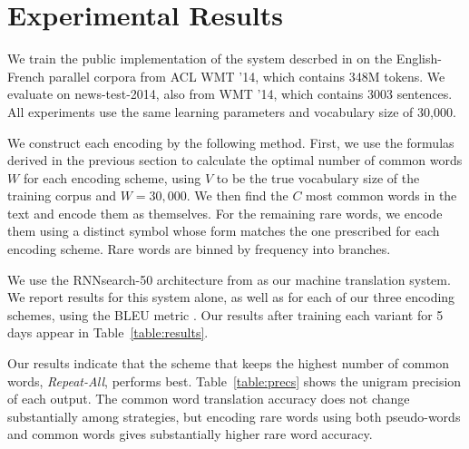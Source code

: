 \section{Experimental Results}
\label{sec:exp}

We train the public implementation of the system descrbed in
 on the English-French parallel corpora
from ACL WMT '14, which contains 348M tokens. We evaluate on news-test-2014,
also from WMT '14, which contains 3003 sentences. All experiments use the same
learning parameters and vocabulary size of 30,000.

We construct each encoding by the following method. First, we use the formulas
derived in the previous section to calculate the optimal number of common words
$W$ for each encoding scheme, using $V$ to be the true vocabulary size of the
training corpus and $W = 30,000$. We then find the $C$ most common words in the
text and encode them as themselves. For the remaining rare words, we encode
them using a distinct symbol whose form matches the one prescribed for each
encoding scheme. Rare words are binned by frequency into branches.

We use the RNNsearch-50 architecture from 
as our machine translation system. We report results for this system alone, as
well as for each of our three encoding schemes, using the BLEU metric
\cite{bleu}. Our results after training each variant for 5 days appear in
Table~\ref{table:results}.

Our results indicate that the scheme that keeps the highest number of common
words, \emph{Repeat-All}, performs best. Table~\ref{table:precs} shows the
unigram precision of each output. The common word translation accuracy does not
change substantially among strategies, but encoding rare words using both
pseudo-words and common words gives substantially higher rare word accuracy.

\begin{table}
  \centering
  \vspace{8pt}
  \caption{BLEU scores (\%) on detokenized test set for each encoding
    scheme after training for 5 days.}
  \label{table:results}
\end{table}

